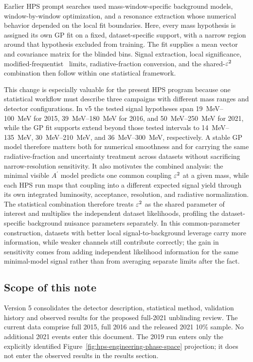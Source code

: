 Earlier HPS prompt searches used mass-window-specific background models,
window-by-window optimization, and a resonance extraction whose numerical behavior
depended on the local fit boundaries. Here, every mass hypothesis is assigned its own
GP fit on a fixed, dataset-specific support, with a narrow region around that hypothesis
excluded from training. The fit supplies a mean vector and covariance matrix for the
blinded bins. Signal extraction, local significance, modified-frequentist \CLs\ limits,
radiative-fraction conversion, and the shared-$\varepsilon^2$ combination then follow within
one statistical framework.

This change is especially valuable for the present HPS program because one statistical
workflow must describe three campaigns with different mass ranges and detector
configurations. In v5 the tested signal hypotheses span \SIrange{19}{100}{MeV} for
2015, \SIrange{39}{180}{MeV} for 2016, and \SIrange{50}{250}{MeV} for 2021, while
the GP fit supports extend beyond those tested intervals to
\SIrange{14}{135}{MeV}, \SIrange{30}{210}{MeV}, and
\SIrange{36}{300}{MeV}, respectively. A stable GP model therefore matters both for
numerical smoothness and for carrying the same radiative-fraction and uncertainty
treatment across datasets without sacrificing narrow-resolution sensitivity. It also
motivates the combined analysis:
the minimal visible $A^\prime$ model predicts one common coupling $\varepsilon^2$ at a given
mass, while each HPS run maps that coupling into a different expected signal yield
through its own integrated luminosity, acceptance, resolution, and radiative
normalization. The
statistical combination therefore treats $\varepsilon^2$ as the shared parameter of interest
and multiplies the independent dataset likelihoods, profiling the dataset-specific
background nuisance parameters separately. In this common-parameter construction,
datasets with better local signal-to-background leverage carry more information, while
weaker channels still contribute correctly; the gain in sensitivity comes from adding
independent likelihood information for the same minimal-model signal rather than from
averaging separate limits after the fact.

\subsection{Scope of this note}

Version 5 consolidates the detector description, statistical method, validation
history and observed results for the proposed full-2021 unblinding review. The
current data comprise full 2015, full 2016 and the released 2021 10\% sample.
No additional 2021 events enter this document. The 2019 run enters only the explicitly identified Figure~\ref{fig:hps-engineering-phase-space}
projection; it does not enter the observed results in the results section.

